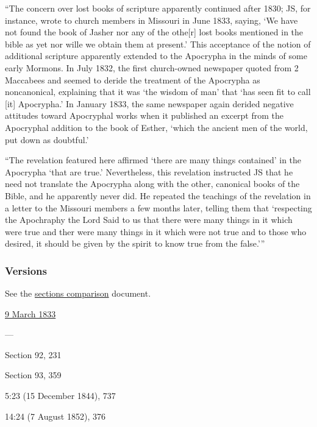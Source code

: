 			``The concern over lost books of scripture apparently continued after 1830; JS, for instance, wrote to church members in Missouri in June 1833, saying, `We have not found the book of Jasher nor any of the othe[r] lost books mentioned in the bible as yet nor wille we obtain them at present.' This acceptance of the notion of additional scripture apparently extended to the Apocrypha in the minds of some early Mormons. In July 1832, the first church-owned newspaper quoted from 2 Maccabees and seemed to deride the treatment of the Apocrypha as noncanonical, explaining that it was `the wisdom of man' that `has seen fit to call [it] Apocrypha.' In January 1833, the same newspaper again derided negative attitudes toward Apocryphal works when it published an excerpt from the Apocryphal addition to the book of Esther, `which the ancient men of the world, put down as doubtful.'
			
			``The revelation featured here affirmed `there are many things contained' in the Apocrypha `that are true.' Nevertheless, this revelation instructed JS that he need not translate the Apocrypha along with the other, canonical books of the Bible, and he apparently never did. He repeated the teachings of the revelation in a letter to the Missouri members a few months later, telling them that `respecting the Apochraphy the Lord Said to us that there were many things in it which were true and ther were many things in it which were not true and to those who desired, it should be given by the spirit to know true from the false.'''
			
	\subsubsection{Versions}
		\label{DC91-V}
		
		See the \href{https://drive.google.com/file/d/1goAvNz8jS4R8slYfMG_db55Ty2z_vmgK/view?usp=sharing}{sections comparison} document.
	
		\begin{compactdesc}
			\item[JSP] \hyperref[EMS-1833-JS-9-MAR-1833]{9 March 1833}
			\item[BC] ---
			\item[DC 1835] Section 92, 231
			\item[DC 1844] Section 93, 359
			\item[TS] 5:23 (15 December 1844), 737	
			\item[MS] 14:24 (7 August 1852), 376
		\end{compactdesc}

